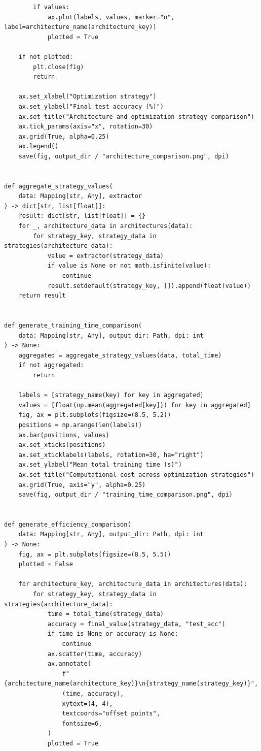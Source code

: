 \begin{verbatim}
        if values:
            ax.plot(labels, values, marker="o", label=architecture_name(architecture_key))
            plotted = True

    if not plotted:
        plt.close(fig)
        return

    ax.set_xlabel("Optimization strategy")
    ax.set_ylabel("Final test accuracy (%)")
    ax.set_title("Architecture and optimization strategy comparison")
    ax.tick_params(axis="x", rotation=30)
    ax.grid(True, alpha=0.25)
    ax.legend()
    save(fig, output_dir / "architecture_comparison.png", dpi)


def aggregate_strategy_values(
    data: Mapping[str, Any], extractor
) -> dict[str, list[float]]:
    result: dict[str, list[float]] = {}
    for _, architecture_data in architectures(data):
        for strategy_key, strategy_data in strategies(architecture_data):
            value = extractor(strategy_data)
            if value is None or not math.isfinite(value):
                continue
            result.setdefault(strategy_key, []).append(float(value))
    return result


def generate_training_time_comparison(
    data: Mapping[str, Any], output_dir: Path, dpi: int
) -> None:
    aggregated = aggregate_strategy_values(data, total_time)
    if not aggregated:
        return

    labels = [strategy_name(key) for key in aggregated]
    values = [float(np.mean(aggregated[key])) for key in aggregated]
    fig, ax = plt.subplots(figsize=(8.5, 5.2))
    positions = np.arange(len(labels))
    ax.bar(positions, values)
    ax.set_xticks(positions)
    ax.set_xticklabels(labels, rotation=30, ha="right")
    ax.set_ylabel("Mean total training time (s)")
    ax.set_title("Computational cost across optimization strategies")
    ax.grid(True, axis="y", alpha=0.25)
    save(fig, output_dir / "training_time_comparison.png", dpi)


def generate_efficiency_comparison(
    data: Mapping[str, Any], output_dir: Path, dpi: int
) -> None:
    fig, ax = plt.subplots(figsize=(8.5, 5.5))
    plotted = False

    for architecture_key, architecture_data in architectures(data):
        for strategy_key, strategy_data in strategies(architecture_data):
            time = total_time(strategy_data)
            accuracy = final_value(strategy_data, "test_acc")
            if time is None or accuracy is None:
                continue
            ax.scatter(time, accuracy)
            ax.annotate(
                f"{architecture_name(architecture_key)}\n{strategy_name(strategy_key)}",
                (time, accuracy),
                xytext=(4, 4),
                textcoords="offset points",
                fontsize=6,
            )
            plotted = True


\end{verbatim}
